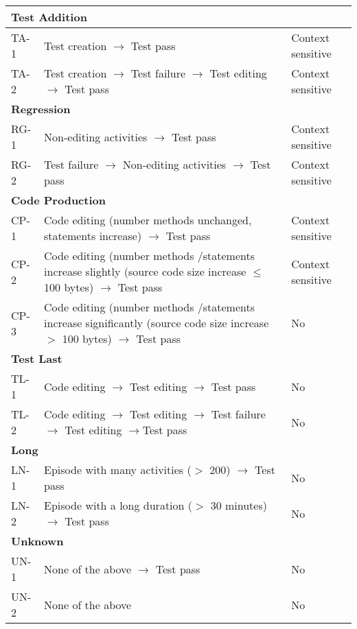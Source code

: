 \begin{sidewaystable}[htbp]
\begin{tabular}{|l|p{18.5cm}|l|}
   \multicolumn{3}{|l|}{\textbf{Test Addition}} \\ \hline
    TA-1        & Test creation $\rightarrow$ Test pass & Context sensitive \\ \hline
    TA-2        & Test creation $\rightarrow$ Test failure $\rightarrow$ Test editing 
            $\rightarrow$ Test pass     
          & Context sensitive \\ \hline

   \multicolumn{3}{|l|}{\textbf{Regression}} \\ \hline
   RG-1 & Non-editing activities $\rightarrow$ Test pass        & Context sensitive \\ \hline
   RG-2 & Test failure $\rightarrow$ Non-editing activities $\rightarrow$ Test pass     
        & Context sensitive \\ \hline

   \multicolumn{3}{|l|}{\textbf{Code Production}} \\ \hline
    CP-1        & Code editing (number methods unchanged, statements increase) 
            $\rightarrow$ Test pass     
          & Context sensitive \\ \hline
    CP-2        & Code editing (number methods /statements increase slightly 
            (source code size increase $\leq$ 100 bytes) $\rightarrow$ Test pass        
          & Context sensitive \\ \hline
    CP-3        & Code editing (number methods /statements increase significantly 
            (source code size increase $>$ 100 bytes) $\rightarrow$ Test pass   
          & No \\ \hline

    \multicolumn{3}{|l|}{\textbf{Test Last}} \\ \hline
    TL-1        & Code editing $\rightarrow$ Test editing $\rightarrow$ Test pass       & No \\ \hline
    TL-2        & Code editing $\rightarrow$ Test editing $\rightarrow$ Test failure 
            $\rightarrow$ Test editing $\rightarrow$Test pass   
          & No \\ \hline

    \multicolumn{3}{|l|}{\textbf{Long}} \\ \hline
    LN-1        & Episode with many activities ($>$ 200) $\rightarrow$ Test pass        & No \\ \hline
    LN-2        & Episode with a long duration ($>$ 30 minutes) $\rightarrow$ Test pass & No \\ \hline

    \multicolumn{3}{|l|}{\textbf{Unknown}} \\ \hline
    UN-1        & None of the above $\rightarrow$ Test pass     & No \\ \hline
    UN-2        & None of the above     & No \\ \hline
  \end{tabular}
  \label{tab:Zorro.Categories}
\end{sidewaystable}

